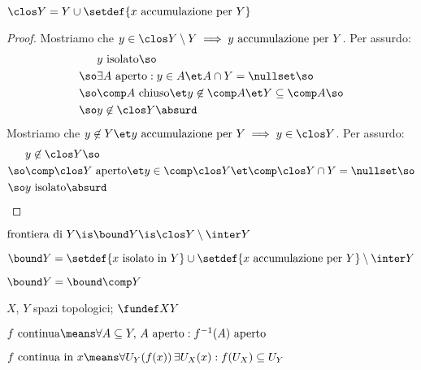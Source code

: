 \begin{lemma}
$\clos Y=Y\cup\setdef{x\text{ accumulazione per }Y}$
\end{lemma}
\begin{proof}
Mostriamo che $y\in\clos Y\setminus Y\implies y\text{ accumulazione per }Y$. Per assurdo:
\begin{align*}
&y\text{ isolato}\so\\
\so&\exists A\text{ aperto}:y\in A\et A\cap Y=\nullset\so\\
\so&\comp A\text{ chiuso}\et y\not\in\comp A\et Y\subseteq\comp A\so\\
\so&y\not\in\clos Y\absurd
\end{align*}
Mostriamo che $y\not\in Y\et y\text{ accumulazione per }Y\implies y\in\clos Y$. Per assurdo:
\begin{align*}
&y\not\in\clos Y\so\\
\so&\comp\clos Y\text{ aperto}\et y\in\comp\clos Y\et\comp\clos Y\cap Y=\nullset\so\\
\so&y\text{ isolato}\absurd \qedhere
\end{align*}
\end{proof}

\begin{defn}
$\text{frontiera di }Y\is\bound Y\is\clos Y\setminus\inter Y$
\end{defn}

\begin{prop}
$\bound Y=\setdef{x\text{ isolato in }Y}\cup\setdef{x\text{ accumulazione per }Y}\setminus\inter Y$
\end{prop}


\begin{prop}
$\bound Y=\bound\comp Y$
\end{prop}


$X$, $Y$ spazi topologici; $\fundef XY$

\begin{defn}[Continuità]
$f\text{ continua}\means\forall A\subseteq Y,\,A\text{ aperto}:f^{-1}(A)\text{ aperto}$
\end{defn}

\begin{defn}
$f\text{ continua in }x\means\forall U_Y(f(x))\,\exists U_X(x):f(U_X)\subseteq U_Y$
\end{defn}

